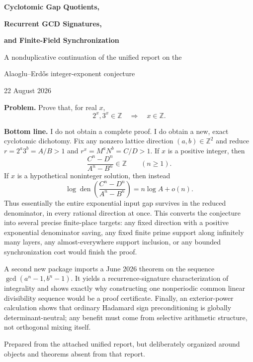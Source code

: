 \documentclass[11pt,oneside]{article}
\theoremstyle{definition}
\theoremstyle{remark}
\newcommand{\Z}{\mathbb Z}
\newcommand{\den}{\operatorname{den}}
\newcommand{\AEconj}{Alaoglu--Erd\H{o}s}
\begin{document}

\begin{titlepage}
\centering
\vspace*{0.8cm}
{\Huge\bfseries Cyclotomic Gap Quotients,\par}
\vspace{0.15cm}
{\Huge\bfseries Recurrent GCD Signatures,\par}
\vspace{0.15cm}
{\Huge\bfseries and Finite-Field Synchronization\par}
\vspace{0.55cm}
{\LARGE A nonduplicative continuation of the unified report on the\par}
\vspace{0.1cm}
{\LARGE \AEconj{} integer-exponent conjecture\par}
\vspace{0.75cm}
{\large 22 August 2026\par}
\vfill
\begin{minipage}{0.91\textwidth}
\small
\textbf{Problem.}  Prove that, for real $x$,
\[
  2^x,3^x\in\Z \quad\Longrightarrow\quad x\in\Z.
\]

\textbf{Bottom line.}  I do not obtain a complete proof.  I do obtain a new, exact
cyclotomic dichotomy.  Fix any nonzero lattice direction $(a,b)\in\Z^2$ and reduce
$r=2^a3^b=A/B>1$ and $r^x=M^aN^b=C/D>1$.  If $x$ is a positive integer, then
\[
  \frac{C^n-D^n}{A^n-B^n}\in\Z\qquad(n\ge1).
\]
If $x$ is a hypothetical noninteger solution, then instead
\[
 \log\den\!\left(\frac{C^n-D^n}{A^n-B^n}\right)
   =n\log A+o(n).
\]
Thus essentially the entire exponential input gap survives in the reduced denominator,
in every rational direction at once.  This converts the conjecture into several precise
finite-place targets: any fixed direction with a positive exponential denominator saving,
any fixed finite prime support along infinitely many layers, any almost-everywhere support
inclusion, or any bounded synchronization cost would finish the proof.

A second new package imports a June 2026 theorem on the sequence
$\gcd(a^n-1,b^n-1)$.  It yields a recurrence-signature characterization of integrality and
shows exactly why constructing one nonperiodic common linear divisibility sequence would be
a proof certificate.  Finally, an exterior-power calculation shows that ordinary Hadamard
sign preconditioning is globally determinant-neutral; any benefit must come from selective
arithmetic structure, not orthogonal mixing itself.
\end{minipage}
\vfill
{\small Prepared from the attached unified report, but deliberately organized around
objects and theorems absent from that report.}
\end{titlepage}
\end{document}
